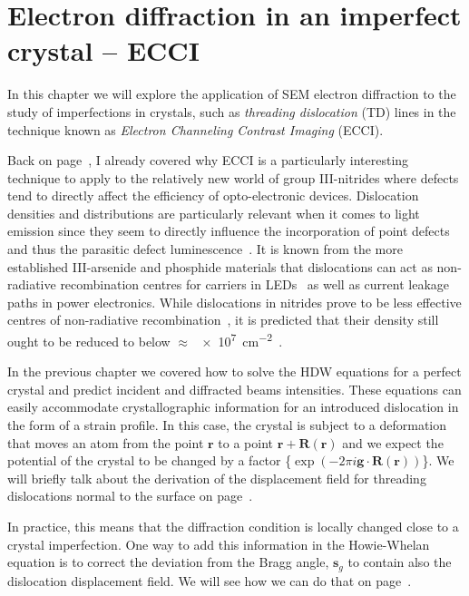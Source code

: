 \chapter{Electron diffraction in an imperfect crystal -- ECCI}
\label{chap:ECCI}



 
 
In this chapter we will explore the application of SEM  electron diffraction to the study of imperfections in crystals, such as \textit{threading dislocation} (TD) lines in the technique known as \textit{Electron Channeling Contrast Imaging} (ECCI). 



Back on page~\pageref{sec:ECCITDmotivation},  I already covered why ECCI is a particularly interesting technique to apply to the relatively new world of group III-nitrides where defects tend to directly affect the efficiency of opto-electronic  devices. Dislocation densities and distributions are particularly relevant when it comes to light emission since they seem to directly influence the incorporation of point defects and thus the parasitic defect luminescence~\cite{Gunnar}. It is known from the more established III-arsenide and phosphide materials that dislocations can act as non-radiative recombination centres for carriers in LEDs~\cite{Peng05} as well as current leakage paths in power electronics. While dislocations in nitrides prove to be less effective centres of non-radiative recombination~\cite{Lester95}, it is predicted that their density still ought to be reduced to below $\approx$ \SI{e7}{\centi \meter^{-2}}~\cite{Karpov02}.


In the previous chapter we covered how to solve the HDW equations for a perfect crystal and predict incident and diffracted beams intensities.  These equations can easily accommodate crystallographic information for an introduced dislocation in the form of a strain profile. In this case, the  crystal is subject to a deformation that moves an atom from the point $\textbf{r}$ to a point $\textbf{r}+\textbf{R}(\textbf{r})$ and we expect  the potential of the crystal to be  changed by a factor \{$\exp(-2\pi i \textbf{g}\cdot \textbf{R}(\textbf{r}))$\}.  We will briefly talk about the derivation of the displacement field for threading dislocations normal to the surface on page~\pageref{sec:strain}.

In practice, this means that the diffraction condition is locally changed close to a crystal imperfection. One way to add this information in the Howie-Whelan equation is to correct the deviation from the Bragg angle, $\textbf{s}_g$ to contain also the dislocation displacement field. We will see how we can do that on page~\pageref{sec:beta}.

